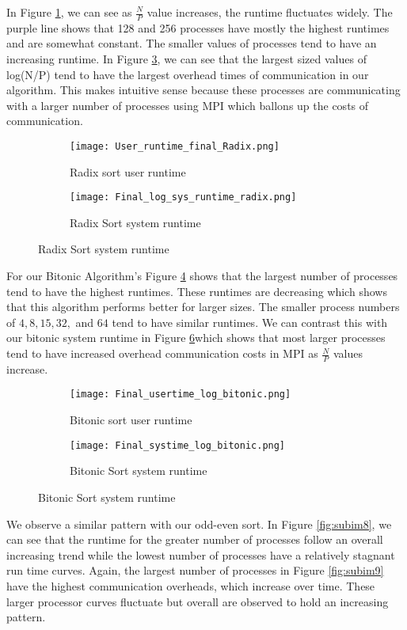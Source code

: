\documentclass[11pt,twocolumn]{article}
\begin{document}
In Figure \ref{fig:subim4}, we can see as $\frac{N}{P}$ value increases, the runtime fluctuates widely. The purple line shows that 128 and 256 processes have mostly the highest runtimes and are somewhat constant. The smaller values of processes tend to have an increasing runtime. In Figure \ref{fig:subim5}, we can see that the largest sized values of log(N/P) tend to have the largest overhead times of communication in our algorithm. This makes intuitive sense because these processes are communicating with a larger number of processes using MPI which ballons up the costs of communication.

\begin{figure}[hbt!]
\begin{subfigure}{\textwidth}
\texttt{[image: User\_runtime\_final\_Radix.png]} 
\caption{Radix sort user runtime}
\label{fig:subim4}
\end{subfigure}
\begin{subfigure}{\textwidth}
\texttt{[image: Final\_log\_sys\_runtime\_radix.png]}
\caption{Radix Sort system runtime}
\label{fig:subim5}
\end{subfigure}
\end{figure}

For our Bitonic Algorithm's Figure \ref{fig:subim6} shows that the largest number of processes tend to have the highest runtimes. These runtimes are decreasing which shows that this algorithm performs better for larger sizes. The smaller process numbers of $4,8,15,32,$ and $64$ tend to have similar runtimes. We can contrast this with our bitonic system runtime in Figure \ref{fig:subim7}which shows that most larger processes tend to have increased overhead communication costs in MPI as $\frac{N}{P}$ values increase.

\begin{figure}[hbt!]
\begin{subfigure}{\textwidth}
\texttt{[image: Final\_usertime\_log\_bitonic.png]}
\caption{Bitonic sort user runtime}
\label{fig:subim6}
\end{subfigure}
\begin{subfigure}{\textwidth}
\texttt{[image: Final\_systime\_log\_bitonic.png]}
\caption{Bitonic Sort system runtime}
\label{fig:subim7}
\end{subfigure}
\end{figure}

We observe a similar pattern with our odd-even sort. In Figure \ref{fig:subim8}, we can see that the runtime for the greater number of processes follow an overall increasing trend while the lowest number of processes have a relatively stagnant run time curves. Again, the largest number of processes in Figure \ref{fig:subim9} have the highest communication overheads, which increase over time. These larger processor curves fluctuate but overall are observed to hold an increasing pattern.
\end{document}
